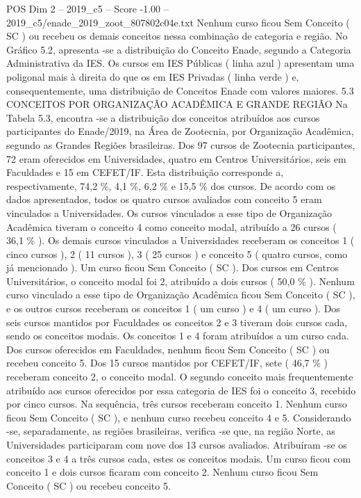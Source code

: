 \begin{textsample}{POS Dim 2 – 2019\_c5 – Score -1.00 – 2019\_c5/enade\_2019\_zoot\_807802c04e.txt}
Nenhum curso ficou Sem Conceito ( SC ) ou recebeu os demais conceitos nessa combinação de categoria e região.
No Gráfico 5.2, apresenta -se a distribuição do Conceito Enade, segundo a Categoria Administrativa da IES.
Os cursos em IES Públicas ( linha azul ) apresentam uma poligonal mais à direita do que os em IES Privadas ( linha verde ) e, consequentemente, uma distribuição de Conceitos Enade com valores maiores. 5.3 CONCEITOS POR ORGANIZAÇÃO ACADÊMICA E GRANDE REGIÃO Na Tabela 5.3, encontra -se a distribuição dos conceitos atribuídos aos cursos participantes do Enade/2019, na Área de Zootecnia, por Organização Acadêmica, segundo as Grandes Regiões brasileiras.
Dos 97 cursos de Zootecnia participantes, 72 eram oferecidos em Universidades, quatro em Centros Universitários, seis em Faculdades e 15 em CEFET/IF.
Esta distribuição corresponde a, respectivamente, 74,2 \%, 4,1 \%, 6,2 \% e 15,5 \% dos cursos.
De acordo com os dados apresentados, todos os quatro cursos avaliados com conceito 5 eram vinculados a Universidades.
Os cursos vinculados a esse tipo de Organização Acadêmica tiveram o conceito 4 como conceito modal, atribuído a 26 cursos ( 36,1 \% ).
Os demais cursos vinculados a Universidades receberam os conceitos 1 ( cinco cursos ), 2 ( 11 cursos ), 3 ( 25 cursos ) e conceito 5 ( quatro cursos, como já mencionado ).
Um curso ficou Sem Conceito ( SC ).
Dos cursos em Centros Universitários, o conceito modal foi 2, atribuído a dois cursos ( 50,0 \% ).
Nenhum curso vinculado a esse tipo de Organização Acadêmica ficou Sem Conceito ( SC ), e os outros cursos receberam os conceitos 1 ( um curso ) e 4 ( um curso ).
Dos seis cursos mantidos por Faculdades os conceitos 2 e 3 tiveram dois cursos cada, sendo os conceitos modais.
Os conceitos 1 e 4 foram atribuídos a um curso cada.
Dos cursos oferecidos em Faculdades, nenhum ficou Sem Conceito ( SC ) ou recebeu conceito 5.
Dos 15 cursos mantidos por CEFET/IF, sete ( 46,7 \% ) receberam conceito 2, o conceito modal.
O segundo conceito mais frequentemente atribuído aos cursos oferecidos por essa categoria de IES foi o conceito 3, recebido por cinco cursos.
Na sequência, três cursos receberam conceito 1.
Nenhum curso ficou Sem Conceito ( SC ), e nenhum curso recebeu conceito 4 e 5.
Considerando -se, separadamente, as regiões brasileiras, verifica -se que, na região Norte, as Universidades participaram com nove dos 13 cursos avaliados.
Atribuíram -se os conceitos 3 e 4 a três cursos cada, estes os conceitos modais.
Um curso ficou com conceito 1 e dois cursos ficaram com conceito 2.
Nenhum curso ficou Sem Conceito ( SC ) ou recebeu conceito 5.

\end{textsample}
